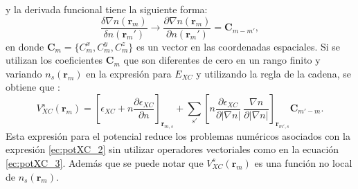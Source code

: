    y la derivada funcional tiene la siguiente forma:
   \begin{equation}
   \frac{\delta \nabla n(\pmb{r}_m)}{\delta n(\pmb{r}_m')} \rightarrow \frac{\partial \nabla n(\pmb{r}_m)}{\partial n(\pmb{r}_m')} = \pmb{C}_{m-m'}, \label{ec:gradCmm}
   \end{equation}
   en donde $\pmb{C}_{m} = \{ C_m ^x , C_m ^y , C_m ^z  \}$  es un vector en las coordenadas espaciales. Si se utilizan los coeficientes $\pmb{C}_m$ que son diferentes de cero en un rango finito y variando $n_s (\pmb{r}_m)$ en la expresi\'on para $E_{XC}$ y utilizando la regla de la cadena, se obtiene que \cite{PhysRevB.50.4954}:
   \begin{equation}
   V_{XC}^s (\pmb{r}_m) = \left[\epsilon_{XC}+n \frac{\partial \epsilon_{XC}}{\partial n}\right]_{\pmb{r}_{m, s}} + \sum_{s'} \left[ n \frac{\partial \epsilon_{XC}}{\partial |\nabla n|} ~\frac{\nabla n}{\partial |\nabla n|}\right] _{\pmb{r}_{m', s}} \pmb{C}_{m'-m} \label{ec:potVxc}.
   \end{equation}
   Esta expresi\'on para el potencial reduce los problemas num\'ericos asociados con la expresi\'on \ref{ec:potXC_2} sin utilizar operadores vectoriales como en la ecuaci\'on \ref{ec:potXC_3}. Adem\'as que se puede notar que $V_{XC}^s (\pmb{r}_m)$ es una funci\'on no local de $n_s (\pmb{r}_m)$.
